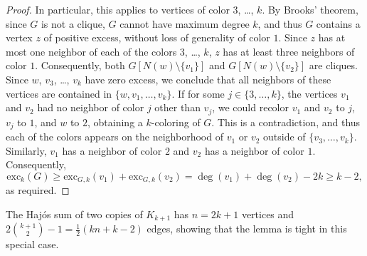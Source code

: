 \documentclass[12pt,twoside,openright,a4paper]{book}
\newcommand{\exc}{\text{exc}}
\begin{document}
\begin{proof}
In particular, this applies to vertices of color $3$, \ldots, $k$.  By Brooks' theorem, since $G$ is not a clique, $G$ cannot have maximum degree $k$, and thus
$G$ contains a vertex $z$ of positive excess, without loss of generality of color $1$.  Since $z$ has at most one neighbor of each of the colors $3$, \ldots, $k$,
$z$ has at least three neighbors of color $1$.  Consequently, both $G[N(w)\setminus\{v_1\}]$ and $G[N(w)\setminus\{v_2\}]$ are cliques.  Since $w$, $v_3$, \ldots, $v_k$
have zero excess, we conclude that all neighbors of these vertices are contained in $\{w, v_1,\ldots, v_k\}$.  If for some $j\in\{3,\ldots,k\}$, the vertices
$v_1$ and $v_2$ had no neighbor of color $j$ other than $v_j$, we could recolor $v_1$ and $v_2$ to $j$, $v_j$ to $1$, and $w$ to $2$, obtaining a $k$-coloring of $G$.
This is a contradiction, and thus each of the colors appears on the neighborhood of $v_1$ or $v_2$ outside of $\{v_3,\ldots,v_k\}$.
Similarly, $v_1$ has a neighbor of color $2$ and $v_2$ has a neighbor of color $1$.
Consequently,
$$\exc_k(G)\ge \exc_{G,k}(v_1)+\exc_{G,k}(v_2)=\deg(v_1)+\deg(v_2)-2k\ge k-2,$$
as required.
\end{proof}
The Haj\'os sum of two copies of $K_{k+1}$ has $n=2k+1$ vertices and $2\binom{k+1}{2}-1=\tfrac{1}{2}(kn+k-2)$ edges, showing that the lemma
is tight in this special case. 
\end{document}
